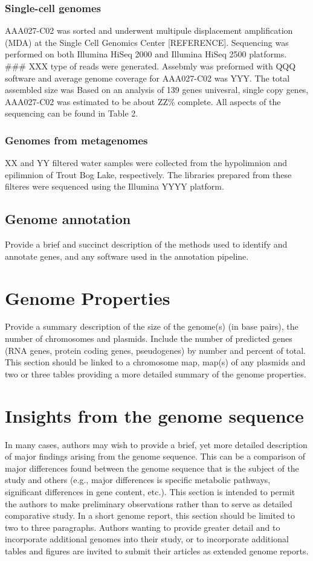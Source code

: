 \documentclass{bmcart}
\begin{document}
\subsubsection*{Single-cell genomes}
AAA027-C02 was sorted and underwent multipule displacement amplification (MDA) at the Single Cell Genomics Center [REFERENCE].  Sequencing was performed on both Illumina HiSeq 2000 and Illumina HiSeq 2500 platforms.  ### XXX type of reads were generated.  Assebmly was preformed with QQQ software and average genome coverage for AAA027-C02 was YYY.  The total assembled size was Based on an analysis of 139 genes univesral, single copy genes, AAA027-C02 was estimated to be about ZZ\% complete. All aspects of the sequencing can be found in Table 2.

\subsubsection*{Genomes from metagenomes}
XX and YY filtered water samples were collected from the hypolimnion and epilimnion of Trout Bog Lake, respectively.  The libraries prepared from these filteres were sequenced using the Illumina YYYY platform.


\subsection*{Genome annotation}
Provide a brief and succinct description of the methods used to identify and annotate genes, and any software used in the annotation pipeline.

\section*{Genome Properties}
Provide a summary description of the size of the genome(s) (in base pairs), the number of chromosomes and plasmids. Include the number of predicted genes (RNA genes, protein coding genes, pseudogenes) by number and percent of total. This section should be linked to a chromosome map, map(s) of any plasmids and two or three tables providing a more detailed summary of the genome properties.

\section*{Insights from the genome sequence}
In many cases, authors may wish to provide a brief, yet more detailed description of major findings arising from the genome sequence. This can be a comparison of major differences found between the genome sequence that is the subject of the study and others (e.g., major differences is specific metabolic pathways, significant differences in gene content, etc.). This section is intended to permit the authors to make preliminary observations rather than to serve as detailed comparative study. In a short genome report, this section should be limited to two to three paragraphs. Authors wanting to provide greater detail and to incorporate additional genomes into their study, or to incorporate additional tables and figures are invited to submit their articles as extended genome reports.
\end{document}
